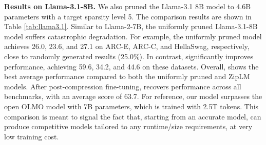 \noindent \textbf{Results on Llama-3.1-8B.} We also pruned the Llama-3.1 8B model to 4.6B parameters with a target sparsity level 5. The comparison results are shown in Table \ref{tab:llama3.1}. Similar to Llama-2-7B, the uniformly pruned Llama-3.1-8B model suffers catastrophic degradation. For example, the uniformly pruned model achieves 26.0, 23.6, and 27.1 on ARC-E, ARC-C, and HellaSwag, respectively, close to randomly generated results (25.0\%). In contrast, \sysname significantly improves performance, achieving 59.6, 34.2, and 44.6 on these datasets. Overall, \sysname shows the best average performance compared to both the uniformly pruned and ZipLM models. After  post-compression fine-tuning, \sysname recovers performance across all benchmarks, with an average score of 63.7. For reference, our model surpasses the open OLMO model with 7B parameters, which is trained with 2.5T tokens. 
This comparison is meant to signal the fact that, starting from an accurate model, \sysname can produce competitive models tailored to any runtime/size requirements, at very low training cost.


